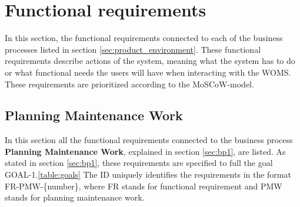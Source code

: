 \section{Functional requirements}
\label{sec:functional_requirements}

In this section, the functional requirements connected to each of the business processes listed in section \ref{sec:product_environment}. These functional requirements describe actions of the system, meaning what the system has to do or what functional needs the users will have when interacting with the WOMS. These requirements are prioritized according to the MoSCoW-model. 

\subsection{Planning Maintenance Work}
\label{sub:planning_maintenance_work}
In this section all the functional requirements connected to the business process \textbf{Planning Maintenance Work}, explained in section \ref{sec:bp1}, are listed. As stated in section \ref{sec:bp1}, these requirements are specified to full the goal GOAL-1.\ref{table:goals} The ID uniquely identifies the requirements in the format FR-PMW-\{number\}, where FR stands for functional requirement and PMW stands for planning maintenance work. 

